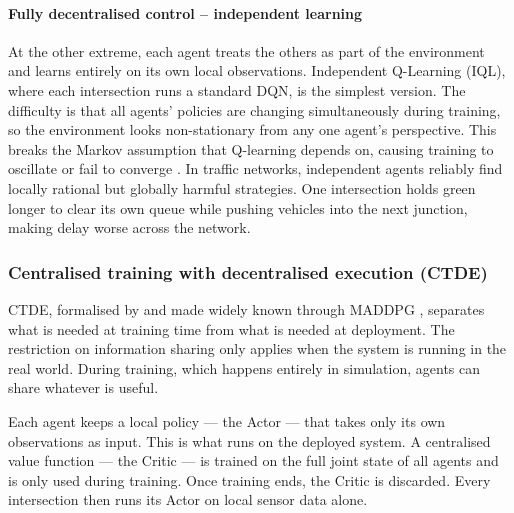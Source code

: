\documentclass[11pt, a4paper]{report}
\begin{document}
\paragraph{Fully decentralised control -- independent learning}

At the other extreme, each agent treats the others as part of the environment and learns entirely on its own local observations. Independent Q-Learning (IQL), where each intersection runs a standard DQN, is the simplest version. The difficulty is that all agents' policies are changing simultaneously during training, so the environment looks non-stationary from any one agent's perspective. This breaks the Markov assumption that Q-learning depends on, causing training to oscillate or fail to converge \cite{tan1993multi}. In traffic networks, independent agents reliably find locally rational but globally harmful strategies. One intersection holds green longer to clear its own queue while pushing vehicles into the next junction, making delay worse across the network.

\subsubsection{Centralised training with decentralised execution (CTDE)}

CTDE, formalised by \cite{oliehoek2008optimal} and made widely known through MADDPG \cite{lowe2017multi}, separates what is needed at training time from what is needed at deployment. The restriction on information sharing only applies when the system is running in the real world. During training, which happens entirely in simulation, agents can share whatever is useful.

Each agent keeps a local policy — the Actor — that takes only its own observations as input. This is what runs on the deployed system. A centralised value function — the Critic — is trained on the full joint state of all agents and is only used during training. Once training ends, the Critic is discarded. Every intersection then runs its Actor on local sensor data alone.
\end{document}

